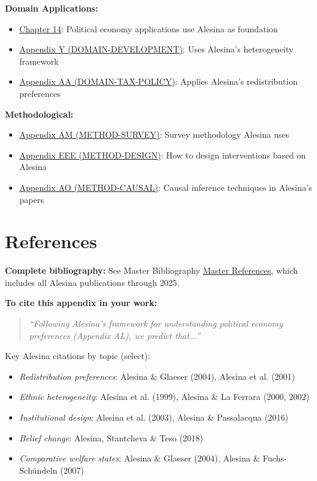 \textbf{Domain Applications:}

\begin{itemize}
\item \hyperref[app:domain-public-econ]{Chapter 14}: Political economy applications use Alesina as foundation
\item \hyperref[app:domain-development]{Appendix Y (DOMAIN-DEVELOPMENT)}: Uses Alesina's heterogeneity framework
\item \hyperref[app:domain-tax-policy]{Appendix AA (DOMAIN-TAX-POLICY)}: Applies Alesina's redistribution preferences
\end{itemize}

\textbf{Methodological:}

\begin{itemize}
\item \hyperref[app:method-survey]{Appendix AM (METHOD-SURVEY)}: Survey methodology Alesina uses
\item \hyperref[app:method-design]{Appendix EEE (METHOD-DESIGN)}: How to design interventions based on Alesina
\item \hyperref[app:method-causal]{Appendix AO (METHOD-CAUSAL)}: Causal inference techniques in Alesina's papers
\end{itemize}

\clearpage


\section{References}
\label{sec:alesina-references}

\textbf{Complete bibliography:} See Master Bibliography \hyperref[sec:master-bib]{Master References}, which includes all Alesina publications through 2025.

\textbf{To cite this appendix in your work:}

\begin{quote}
\textit{``Following Alesina's framework for understanding political economy preferences (Appendix AL), we predict that...''}
\end{quote}

Key Alesina citations by topic (select):

\nocite{bcm_master}

\begin{itemize}
\item \emph{Redistribution preferences}: Alesina \& Glaeser (2004), Alesina et al. (2001)
\item \emph{Ethnic heterogeneity}: Alesina et al. (1999), Alesina \& La Ferrara (2000, 2002)
\item \emph{Institutional design}: Alesina et al. (2003), Alesina \& Passalacqua (2016)
\item \emph{Belief change}: Alesina, Stantcheva \& Teso (2018)
\item \emph{Comparative welfare states}: Alesina \& Glaeser (2004), Alesina \& Fuchs-Schündeln (2007)
\end{itemize}



